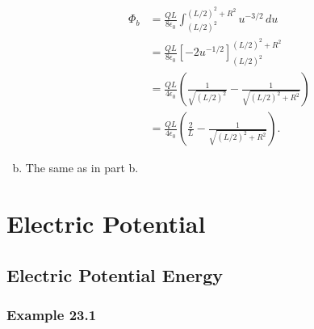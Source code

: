 \documentclass{article}
\begin{document}
\begin{enumerate}[a)]
        \begin{align*}
          \Phi_b & = \frac{Q L}{8 \epsilon_0} \int_{(L / 2)^2}^{(L / 2)^2 + R^2} u^{-3/2} \, du                           \\
                 & = \frac{Q L}{8 \epsilon_0} \left[ -2 u^{-1/2} \right]_{(L / 2)^2}^{(L / 2)^2 + R^2}                    \\
                 & = \frac{Q L}{4 \epsilon_0} \left( \frac{1}{\sqrt{(L / 2)^2}} -\frac{1}{\sqrt{(L / 2)^2 + R^2}} \right) \\
                 & = \frac{Q L}{4 \epsilon_0} \left( \frac{2}{L} - \frac{1}{\sqrt{(L / 2)^2 + R^2}} \right).
        \end{align*}

  \item The same as in part b.
\end{enumerate}

\section{Electric Potential}

\subsection{Electric Potential Energy}

\subsubsection{Example 23.1}
\end{document}
